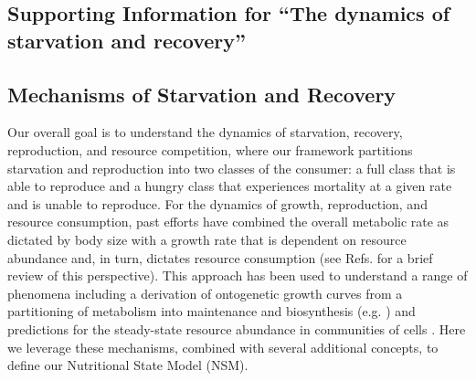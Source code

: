 \documentclass[twocolumn,preprintnumbers,amsmath,amssymb,superscriptaddress]{revtex4}
\begin{document}
\begin{bibunit}[unsrt]
\section*{Supporting Information for ``The dynamics of starvation and recovery''}

\subsection*{Mechanisms of Starvation and Recovery}
Our overall goal is to understand the dynamics of starvation, recovery, reproduction, and resource competition, where our framework partitions starvation and reproduction into two classes of the consumer: a full class that is able to reproduce and a hungry class that experiences mortality at a given rate and is unable to reproduce. For the dynamics of growth, reproduction, and resource consumption, past efforts have combined the overall metabolic rate as dictated by body size with a growth rate that is dependent on resource abundance and, in turn, dictates resource consumption (see Refs. \cite{Kempes:2012hy,kempes2014morphological} for a brief review of this perspective). This approach has been used to understand a range of phenomena including a derivation of ontogenetic growth curves from a partitioning of metabolism into maintenance and biosynthesis (e.g. \cite{West:2001bv,moses2008rmo,hou,Kempes:2012hy}) and predictions for the steady-state resource abundance in communities of cells \cite{kempes2014morphological}. Here we leverage these mechanisms, combined with several additional concepts, to define our Nutritional State Model (NSM).


\end{bibunit}
\end{document}
